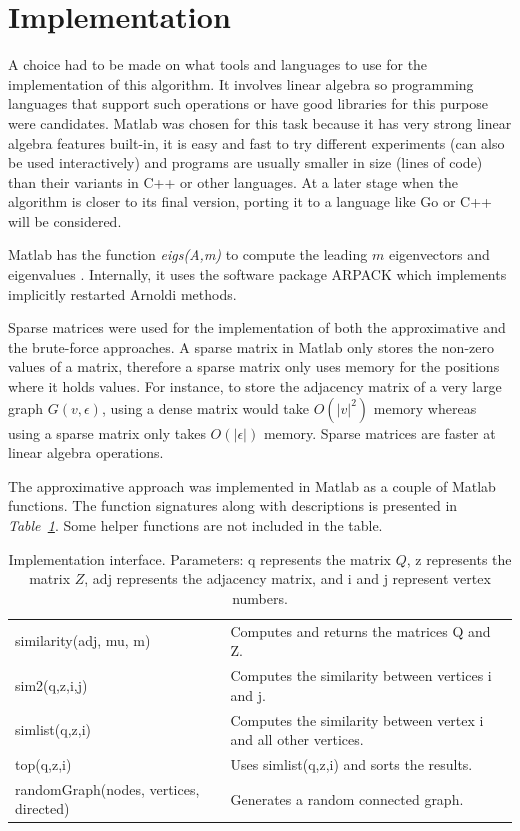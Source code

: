 \documentclass[12pt]{report}
\begin{document}
\section*{Implementation}
%
A choice had to be made on what tools and languages to use for the implementation
of this algorithm. It involves linear algebra so programming languages that support
such operations or have good libraries for this purpose were candidates. Matlab
was chosen for this task because it has very strong linear algebra features built-in,
it is easy and fast to try different experiments (can also be used interactively)
and programs are usually smaller in size (lines of code) than their variants in C++
or other languages. At a later stage when the algorithm is closer to its final
version, porting it to a language like Go or C++ will be considered.


Matlab has the function \textit{eigs(A,m)} to compute the leading $m$ eigenvectors
and eigenvalues \cite{matlab:eigs}. Internally, it uses the software package ARPACK which implements
implicitly restarted Arnoldi methods. \cite{lehoucq1998arpack}


Sparse matrices were used for the implementation of both the approximative and
the brute-force approaches. A sparse matrix in Matlab only stores the non-zero
values of a matrix, therefore a sparse matrix only uses memory for the positions
where it holds values\cite{gilbert1992sparse}. For instance, to store the adjacency matrix of a very
large graph $G(v,\epsilon)$, using a dense matrix would take $O(|v|^2)$ memory
whereas using a sparse matrix only takes $O(|\epsilon|)$ memory. Sparse matrices
are faster at linear algebra operations.


The approximative approach was implemented in Matlab as a couple of Matlab functions.
The function signatures along with descriptions is presented in \emph{Table~\ref{tbl:interface}}.
Some helper functions are not included in the table.
%
\begin{table}[!ht]\footnotesize
   \centering
   \begin{tabular}{ll}
   similarity(adj, mu, m) & Computes and returns the matrices Q and Z. \\
   sim2(q,z,i,j) & Computes the similarity between vertices i and j. \\
   simlist(q,z,i) & Computes the similarity between vertex i and all other vertices. \\
   top(q,z,i) & Uses simlist(q,z,i) and sorts the results. \\
   randomGraph(nodes, vertices, directed) & Generates a random connected graph.
   \end{tabular}
   \caption{Implementation interface. Parameters: q represents the matrix $Q$, z represents the matrix $Z$, adj represents the adjacency matrix, and i and j represent vertex numbers.}
   \label{tbl:interface}
\end{table}
\end{document}

